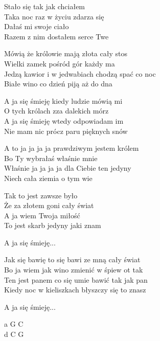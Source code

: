 \begin{text}
    Stało się tak jak chciałem\\
    Taka noc raz w życiu zdarza się\\
    Dałaś mi swoje ciało\\
    Razem z nim dostałem serce Twe

    Mówią że królowie mają złota cały stos\\
    Wielki zamek pośród gór każdy ma\\
    Jedzą kawior i w jedwabiach chodzą spać co noc\\
    Białe wino co dzień piją aż do dna

    \vin A ja się śmieję kiedy ludzie mówią mi\\
    \vin O tych królach zza dalekich mórz\\
    \vin A ja się śmieję wtedy odpowiadam im\\
    \vin Nie mam nic prócz paru pięknych snów

    \vin A to ja ja ja ja prawdziwym jestem królem\\
    \vin Bo Ty wybrałaś właśnie mnie\\
    \vin Właśnie ja ja ja ja dla Ciebie ten jedyny\\
    \vin Niech cała ziemia o tym wie

    Tak to jest zawsze było\\
    Że za złotem goni cały świat\\
    A ja wiem Twoja miłość\\
    To jest skarb jedyny jaki znam

    \vin A ja się śmieję...

    Jak się bawię to się bawi ze mną cały świat\\
    Bo ja wiem jak wino zmienić w śpiew ot tak\\
    Ten jest panem co się umie bawić tak jak pan\\
    Kiedy noc w kieliszkach błyszczy się to znasz

    \vin A ja się śmieję...
\end{text}
\begin{chord}
    a G C\\
    d C G
\end{chord}